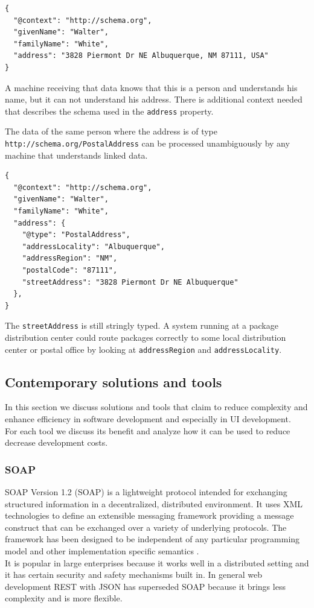 \lstset{language=JSON}
\begin{lstlisting}[caption=A person with an address of type Text]
{
  "@context": "http://schema.org",
  "givenName": "Walter",
  "familyName": "White",
  "address": "3828 Piermont Dr NE Albuquerque, NM 87111, USA"
}
\end{lstlisting}

A machine receiving that data knows that this is a person and understands his name, but it can not understand his address. There is additional context needed that describes the schema used in the \lstinline{address} property.

The data of the same person where the address is of type \lstinline{http://schema.org/PostalAddress} can be processed unambiguously by any machine that understands linked data.

\lstset{language=JSON}
\begin{lstlisting}[caption=A person with an address of type PostalAddress]
{
  "@context": "http://schema.org",
  "givenName": "Walter",
  "familyName": "White",
  "address": {
    "@type": "PostalAddress",
    "addressLocality": "Albuquerque",
    "addressRegion": "NM",
    "postalCode": "87111",
    "streetAddress": "3828 Piermont Dr NE Albuquerque"
  },
}
\end{lstlisting}

The \lstinline{streetAddress} is still stringly typed. A system running at a package distribution center could route packages correctly to some local distribution center or postal office by looking at \lstinline{addressRegion} and \lstinline{addressLocality}.

\subsection{Contemporary solutions and tools}
In this section we discuss solutions and tools that claim to reduce complexity and enhance efficiency in software development and especially in UI development. \\ For each tool we discuss its benefit and analyze how it can be used to reduce decrease development costs.

\subsubsection{SOAP}
SOAP Version 1.2 (SOAP) is a lightweight protocol intended for exchanging structured information in a decentralized, distributed environment. It uses XML technologies to define an extensible messaging framework providing a message construct that can be exchanged over a variety of underlying protocols. The framework has been designed to be independent of any particular programming model and other implementation specific semantics \citep{soap}. \\ It is popular in large enterprises because it works well in a distributed setting and it has certain security and safety mechanisms built in. In general web development REST with JSON has superseded SOAP because it brings less complexity and is more flexible.

